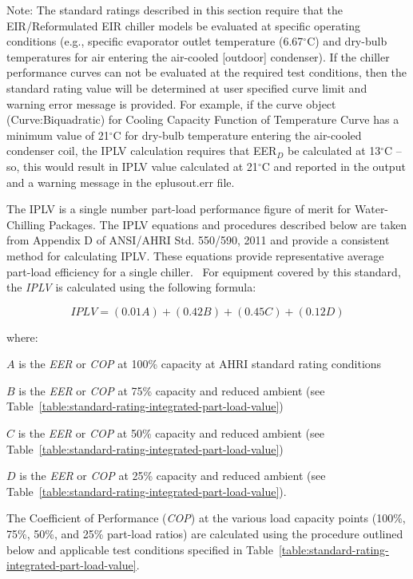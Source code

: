 \begin{callout}
Note: The standard ratings described in this section require that the EIR/Reformulated EIR chiller models be evaluated at specific operating conditions (e.g., specific evaporator outlet temperature (6.67\(^{\circ}\)C) and dry-bulb temperatures for air entering the air-cooled {[}outdoor{]} condenser). If the chiller~ performance curves can not be evaluated at the required test conditions, then the standard rating value will be determined at user specified curve limit and warning error message is provided. For example, if the curve object (Curve:Biquadratic) for Cooling Capacity Function of Temperature Curve has a minimum value of 21\(^{\circ}\)C for dry-bulb temperature entering the air-cooled condenser coil, the IPLV calculation requires that EER\(_{D}\) be calculated at 13\(^{\circ}\)C -- so, this would result in IPLV value calculated at 21\(^{\circ}\)C and reported in the output and a warning message in the eplusout.err file.
\end{callout}

The IPLV is a single number part-load performance figure of merit for Water-Chilling Packages. The IPLV equations and procedures described below are taken from Appendix D of ANSI/AHRI Std. 550/590, 2011 and provide a consistent method for calculating IPLV. These equations provide representative average part-load efficiency for a single chiller. ~For equipment covered by this standard, the \emph{IPLV} is calculated using the following formula:

\begin{equation}
IPLV = (0.01A) + (0.42B) + (0.45C) + (0.12D)
\end{equation}

where:

\(A\) is the \emph{EER} or \emph{COP} at 100\% capacity at AHRI standard rating conditions

\(B\) is the \emph{EER} or \emph{COP} at 75\% capacity and reduced ambient (see Table~\ref{table:standard-rating-integrated-part-load-value})

\(C\) is the \emph{EER} or \emph{COP} at 50\% capacity and reduced ambient (see Table~\ref{table:standard-rating-integrated-part-load-value})

\(D\) is the \emph{EER} or \emph{COP} at 25\% capacity and reduced ambient (see Table~\ref{table:standard-rating-integrated-part-load-value}).

The Coefficient of Performance (\emph{COP}) at the various load capacity points (100\%, 75\%, 50\%, and 25\% part-load ratios) are calculated using the procedure outlined below and applicable test conditions specified in Table~\ref{table:standard-rating-integrated-part-load-value}.

